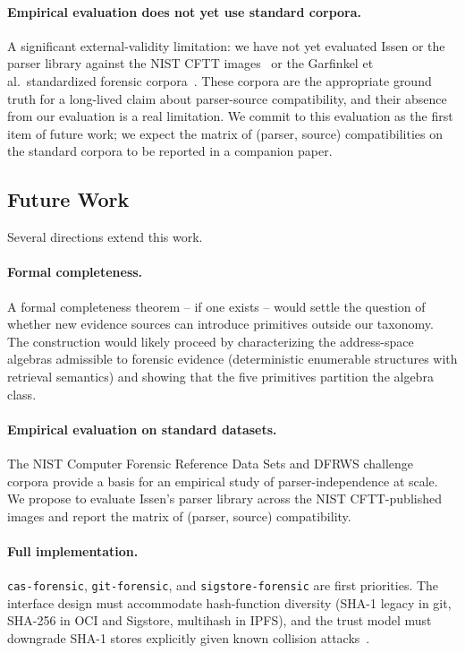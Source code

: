 \paragraph{Empirical evaluation does not yet use standard corpora.} A
significant external-validity limitation: we have not yet evaluated Issen
or the parser library against the NIST CFTT
images~\cite{nistcftt} or the
Garfinkel et al.\ standardized forensic corpora~\cite{garfinkel2009corpora}.
These corpora are the appropriate ground truth for a long-lived claim
about parser-source compatibility, and their absence from our evaluation
is a real limitation. We commit to this evaluation as the first item of
future work; we expect the matrix of (parser, source) compatibilities on
the standard corpora to be reported in a companion paper.


\subsection{Future Work}

Several directions extend this work.

\paragraph{Formal completeness.} A formal completeness theorem -- if one
exists -- would settle the question of whether new evidence sources can
introduce primitives outside our taxonomy. The construction would likely
proceed by characterizing the address-space algebras admissible to
forensic evidence (deterministic enumerable structures with retrieval
semantics) and showing that the five primitives partition the algebra
class.

\paragraph{Empirical evaluation on standard datasets.} The NIST Computer
Forensic Reference Data Sets and DFRWS challenge corpora provide a basis
for an empirical study of parser-independence at scale. We propose to
evaluate Issen's parser library across the NIST CFTT-published images and
report the matrix of (parser, source) compatibility.

\paragraph{Full  implementation.} \texttt{cas-forensic},
\texttt{git-forensic}, and \texttt{sigstore-forensic} are first priorities.
The interface design must accommodate hash-function diversity (SHA-1
legacy in git, SHA-256 in OCI and Sigstore, multihash in IPFS), and the
trust model must downgrade SHA-1 stores explicitly given known collision
attacks~\cite{stevens2017sha1}.

